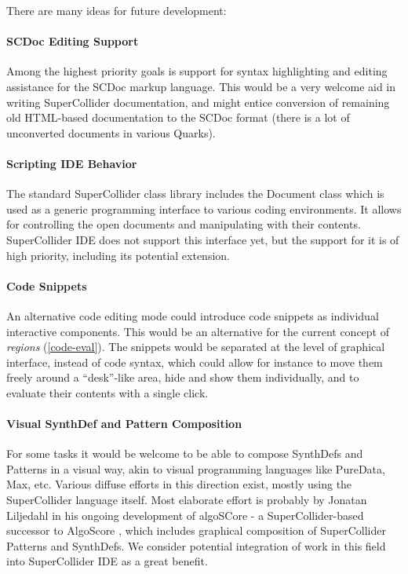 \documentclass[11pt,a4paper]{article}
\begin{document}
There are many ideas for future development:

\paragraph{SCDoc Editing Support} \hfill

Among the highest priority goals is support for syntax highlighting and editing assistance for the SCDoc markup
language. This would be a very welcome aid in writing SuperCollider documentation, and might entice conversion of
remaining old HTML-based documentation to the SCDoc format (there is a lot of unconverted documents in various Quarks).

\paragraph{Scripting IDE Behavior} \hfill

The standard SuperCollider class library includes the Document class which is used as a generic programming interface to
various coding environments. It allows for controlling the open documents and manipulating with their contents.
SuperCollider IDE does not support this interface yet, but the support for it is of high priority, including its
potential extension.

\paragraph{Code Snippets} \hfill

An alternative code editing mode could introduce code snippets as individual interactive components. This would be
an alternative for the current concept of \emph{regions} (\ref{code-eval}). The snippets would be separated at the
level of graphical interface, instead of code syntax, which could allow for instance to move them freely around a
``desk''-like area, hide and show them individually, and to evaluate their contents with a single click.

\paragraph{Visual SynthDef and Pattern Composition} \hfill

For some tasks it would be welcome to be able to compose SynthDefs and Patterns in a visual way, akin to visual
programming languages like PureData, Max, etc. Various diffuse efforts in this direction exist, mostly using the
SuperCollider language itself. Most elaborate effort is probably by Jonatan Liljedahl in his ongoing development of
algoSCore - a SuperCollider-based successor to AlgoScore \cite{algoscore}, which includes graphical composition of
SuperCollider Patterns and SynthDefs. We consider potential integration of work in this field into SuperCollider IDE as
a great benefit.
\end{document}
